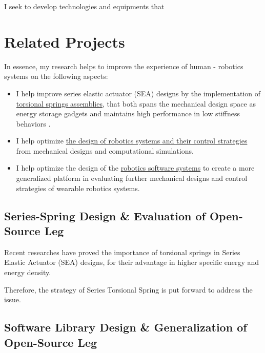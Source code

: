 \documentclass[8pt]{article}
\begin{document}

I seek to develop technologies and equipments that 

% 

\section{Related Projects}

In essence, my research helps to improve the experience of human - robotics systems on the following aspects: 

\begin{itemize}

    \item {I help improve series elastic actuator (SEA) designs by the implementation of \hyperref[sec:series-spring]{torsional springs assemblies}, that both spans the mechanical design space as energy storage gadgets and maintains high performance in low stiffness behaviors \cite{SpringDesign_OSL}.}
    
    \item {I help optimize \hyperref[sec:RobotSwimmer]{the design of robotics systems and their control strategies} from mechanical designs and computational simulations.}
    
    \item {I help optimize the design of the \hyperref[sec:OSL-Library]{robotics software systems} to create a more generalized platform in evaluating further mechanical designs and control strategies of wearable robotics systems.}

\end{itemize}


    \subsection{Series-Spring Design \& Evaluation of Open-Source Leg}  \label{sec:series-spring}

    Recent researches have proved the importance of torsional springs in Series Elastic Actuator (SEA) designs, for their advantage in higher specific energy and energy density. 


    Therefore, the strategy of Series Torsional Spring is put forward to address the issue. 


    \subsection{Software Library Design \& Generalization of Open-Source Leg}   \label{sec:OSL-Library}
\end{document}

